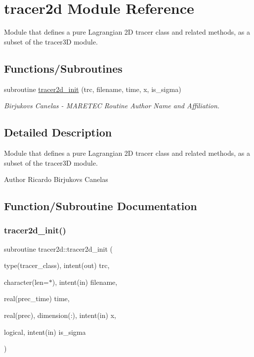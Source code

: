 \hypertarget{namespacetracer2d}{}\section{tracer2d Module Reference}
\label{namespacetracer2d}


Module that defines a pure Lagrangian 2D tracer class and related methods, as a subset of the tracer3D module.  


\subsection*{Functions/\+Subroutines}
\begin{DoxyCompactItemize}
\item 
subroutine \mbox{\hyperlink{namespacetracer2d_abebf96ac23ed37832000c68fea45f584}{tracer2d\+\_\+init}} (trc, filename, time, x, is\+\_\+sigma)
\begin{DoxyCompactList}\small\item\em Birjukovs Canelas -\/ M\+A\+R\+E\+T\+EC Routine Author Name and Affiliation. \end{DoxyCompactList}\end{DoxyCompactItemize}


\subsection{Detailed Description}
Module that defines a pure Lagrangian 2D tracer class and related methods, as a subset of the tracer3D module. 

\begin{DoxyAuthor}{Author}
Ricardo Birjukovs Canelas 
\end{DoxyAuthor}


\subsection{Function/\+Subroutine Documentation}
\mbox{\label{namespacetracer2d_abebf96ac23ed37832000c68fea45f584}} 
\subsubsection{\texorpdfstring{tracer2d\+\_\+init()}{tracer2d\_init()}}
{\footnotesize\ttfamily subroutine tracer2d\+::tracer2d\+\_\+init (\begin{DoxyParamCaption}\item[{type(tracer\+\_\+class), intent(out)}]{trc,  }\item[{character(len=$\ast$), intent(in)}]{filename,  }\item[{real(prec\+\_\+time)}]{time,  }\item[{real(prec), dimension(\+:), intent(in)}]{x,  }\item[{logical, intent(in)}]{is\+\_\+sigma }\end{DoxyParamCaption})}



